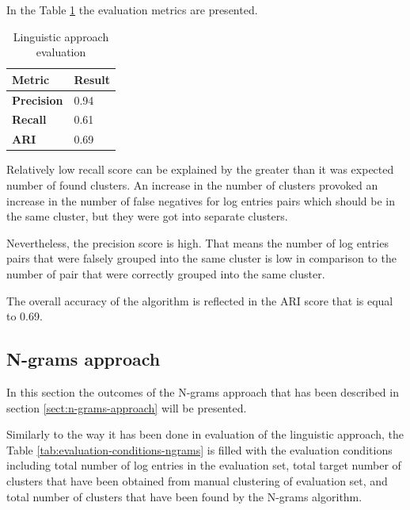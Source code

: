 \documentclass[thesis=M,english]{FITthesis}[2019/12/23]
\begin{document}

In the Table \ref{tab:linguistic-evaluation} the evaluation metrics are presented.

\begin{table}[h!]\centering
	\caption{Linguistic approach evaluation}\label{tab:linguistic-evaluation}
	\begin{tabular}{ |m{9em}|m{4em}| }
		\hline
		\textbf{Metric} & \textbf{Result}\\
		\hline
		\textbf{Precision} & 0.94 \\
		\hline
		\textbf{Recall} & 0.61 \\
		\hline
		\textbf{ARI} & 0.69 \\
		\hline
	\end{tabular}
\end{table}

Relatively low recall score can be explained by the greater than it was expected number of found clusters. An increase in the number of clusters provoked an increase in the number of false negatives for log entries pairs which should be in the same cluster, but they were got into separate clusters.

Nevertheless, the precision score is high. That means the number of log entries pairs that were falsely grouped into the same cluster is low in comparison to the number of pair that were correctly grouped into the same cluster.

The overall accuracy of the algorithm is reflected in the ARI score that is equal to 0.69. 

\subsection{N-grams approach}
In this section the outcomes of the N-grams approach that has been described in section \ref{sect:n-grams-approach}  will be presented.

Similarly to the way it has been done in evaluation of the linguistic approach, the Table \ref{tab:evaluation-conditions-ngrams} is filled with the evaluation conditions including total number of log entries in the evaluation set, total target number of clusters that have been obtained from manual clustering of evaluation set, and total number of clusters that have been found by the N-grams algorithm.
\end{document}
